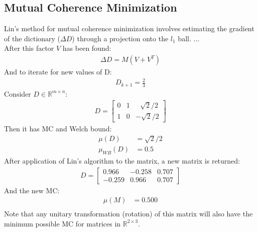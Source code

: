 \documentclass[journal]{IEEEtran}
\begin{document}
\subsection{Mutual Coherence Minimization}
Lin's method for mutual coherence minimization involves estimating the gradient of the dictionary
($\Delta D$) through a projection onto the $l_1$ ball. $\ldots$ \\
After this factor $V$ has been found:
\begin{align}
    \Delta D = M(V + V^T)
\end{align}
And to iterate for new values of D:
\begin{align}
    D_{k+1} = \frac{2}{3}
\end{align}
Consider $D \in \mathbb{R}^{m\times n}$:
\begin{align}
    D = \begin{bmatrix} 0 &1 &\>\>\>\sqrt{2}/2 \\
                        1 &0 &-\sqrt{2}/2 \end{bmatrix}
\end{align}
Then it has MC and Welch bound:
\begin{align}
\mu (D) &= \sqrt{2}/2 \\
\mu_{WB} (D) &= 0.5
\end{align}
After application of Lin's algorithm to the matrix, a new matrix is returned:
\begin{align}
    D = \left[\begin{array}{ccc} 0.966 & -0.258  &0.707\\ -0.259 & 0.966 & 0.707 \end{array}\right] 
\end{align}
And the new MC:
\begin{align}
\mu (M) &= 0.500 \\[1em]
\end{align}
Note that any unitary transformation (rotation) of this matrix will also have the minimum possible MC for
matrices in $\mathbb{R}^{2 \times 3}$.
\end{document}
